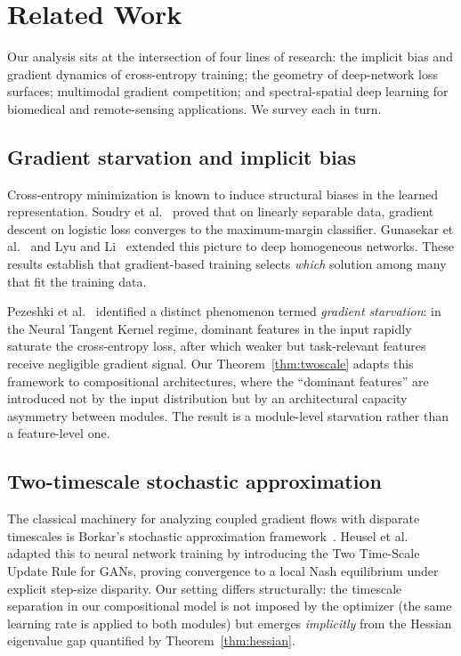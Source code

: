 \section{Related Work}
\label{sec:related}

Our analysis sits at the intersection of four lines of research: the
implicit bias and gradient dynamics of cross-entropy training; the
geometry of deep-network loss surfaces; multimodal gradient competition;
and spectral-spatial deep learning for biomedical and remote-sensing
applications. We survey each in turn.

\subsection{Gradient starvation and implicit bias}

Cross-entropy minimization is known to induce structural biases in the
learned representation. Soudry et al.~\cite{soudry2018implicit} proved
that on linearly separable data, gradient descent on logistic loss
converges to the maximum-margin classifier. Gunasekar et
al.~\cite{gunasekar2017implicit} and Lyu and Li~\cite{lyu2020gradient}
extended this picture to deep homogeneous networks. These results
establish that gradient-based training selects \emph{which} solution
among many that fit the training data.

Pezeshki et al.~\cite{pezeshki2021gradient} identified a distinct
phenomenon termed \emph{gradient starvation}: in the Neural Tangent
Kernel regime, dominant features in the input rapidly saturate the
cross-entropy loss, after which weaker but task-relevant features
receive negligible gradient signal. Our Theorem~\ref{thm:twoscale}
adapts this framework to compositional architectures, where the
``dominant features'' are introduced not by the input distribution
but by an architectural capacity asymmetry between modules. The
result is a module-level starvation rather than a feature-level one.

\subsection{Two-timescale stochastic approximation}

The classical machinery for analyzing coupled gradient flows with
disparate timescales is Borkar's stochastic approximation
framework~\cite{borkar2008stochastic}. Heusel et
al.~\cite{heusel2017gans} adapted this to neural network training by
introducing the Two Time-Scale Update Rule for GANs, proving
convergence to a local Nash equilibrium under explicit step-size
disparity. Our setting differs structurally: the timescale separation
in our compositional model is not imposed by the optimizer (the same
learning rate is applied to both modules) but emerges \emph{implicitly}
from the Hessian eigenvalue gap quantified by Theorem~\ref{thm:hessian}.


